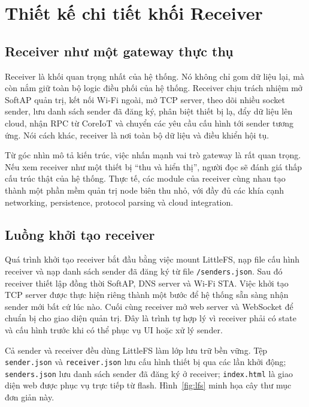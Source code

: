 \documentclass[12pt,a4paper]{report}
\begin{document}
\section{Thiết kế chi tiết khối Receiver}

\subsection{Receiver như một gateway thực thụ}
Receiver là khối quan trọng nhất của hệ thống. Nó không chỉ gom dữ liệu lại, mà còn nắm giữ toàn bộ logic điều phối của hệ thống. Receiver chịu trách nhiệm mở SoftAP quản trị, kết nối Wi-Fi ngoài, mở TCP server, theo dõi nhiều socket sender, lưu danh sách sender đã đăng ký, phân biệt thiết bị lạ, đẩy dữ liệu lên cloud, nhận RPC từ CoreIoT và chuyển các yêu cầu cấu hình tới sender tương ứng. Nói cách khác, receiver là nơi toàn bộ dữ liệu và điều khiển hội tụ.

Từ góc nhìn mô tả kiến trúc, việc nhấn mạnh vai trò gateway là rất quan trọng. Nếu xem receiver như một thiết bị “thu và hiển thị”, người đọc sẽ đánh giá thấp cấu trúc thật của hệ thống. Thực tế, các module của receiver cùng nhau tạo thành một phần mềm quản trị node biên thu nhỏ, với đầy đủ các khía cạnh networking, persistence, protocol parsing và cloud integration.

\subsection{Luồng khởi tạo receiver}
Quá trình khởi tạo receiver bắt đầu bằng việc mount LittleFS, nạp file cấu hình receiver và nạp danh sách sender đã đăng ký từ file \texttt{/senders.json}. Sau đó receiver thiết lập đồng thời SoftAP, DNS server và Wi-Fi STA. Việc khởi tạo TCP server được thực hiện riêng thành một bước để hệ thống sẵn sàng nhận sender mới bất cứ lúc nào. Cuối cùng receiver mở web server và WebSocket để chuẩn bị cho giao diện quản trị. Đây là trình tự hợp lý vì receiver phải có state và cấu hình trước khi có thể phục vụ UI hoặc xử lý sender.

Cả sender và receiver đều dùng LittleFS làm lớp lưu trữ bền vững. Tệp \texttt{sender.json} và \texttt{receiver.json} lưu cấu hình thiết bị qua các lần khởi động; \texttt{senders.json} lưu danh sách sender đã đăng ký ở receiver; \texttt{index.html} là giao diện web được phục vụ trực tiếp từ flash. Hình~\ref{fig:lfs} minh họa cây thư mục đơn giản này.
\end{document}
